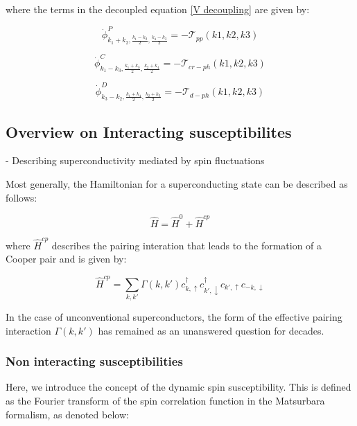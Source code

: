 \documentclass[12pt]{article}
\begin{document}
where the terms in the decoupled equation \eqref{V decoupling} are given by:

\begin{equation}
    \dot{\phi}^{P}_{k_1 +k_2, \frac{k_1 - k_2}{2}, \frac{k_4-k_3}{2}} = - \mathcal{T}_{pp}(k1,k2,k3)
\end{equation}


\begin{equation}
    \dot{\phi}^{C}_{k_1 - k_3, \frac{k_1 +k_3}{2}, \frac{k_2+k_4}{2}} = - \mathcal{T}_{cr-ph}(k1,k2,k3)
\end{equation}

\begin{equation}
    \dot{\phi}^{D}_{k_3- k_2, \frac{k_1 + k_4}{2}, \frac{k_2+k_3}{2}} = - \mathcal{T}_{d-ph}(k1,k2,k3)
\end{equation}


\subsection{Overview on Interacting susceptibilites}

- Describing superconductivity mediated by spin fluctuations

Most generally, the Hamiltonian for a superconducting state can be described as follows:

\begin{equation}\label{General Hamiltonian}
    \hat{H} = \hat{H}^0 + \hat{H}^{cp}
\end{equation}

where $\hat{H}^{cp}$ describes the pairing interation that leads to the formation of a Cooper pair and is given by:

\begin{equation}\label{Hcp}
    \hat{H}^{cp} = \sum_{k,k'} \Gamma(k, k') c^{\dagger}_{k, \uparrow}  c^{\dagger}_{k', \downarrow} c_{k', \uparrow}c_{-k, \downarrow}
\end{equation}

In the case of unconventional superconductors, the form of the effective pairing interaction $\Gamma(k,k')$ has remained as an unanswered question for decades. 

\subsubsection{Non interacting susceptibilities}

Here, we introduce the concept of the dynamic spin susceptibility. This is defined as the Fourier transform of the spin correlation function in the Matsurbara formalism, as denoted below:
\end{document}
